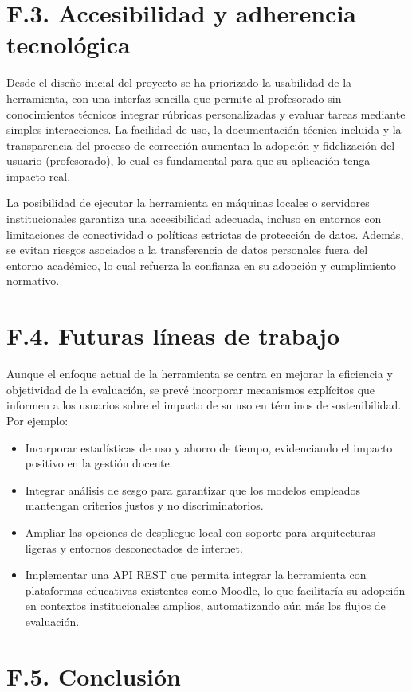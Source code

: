 \section*{F.3. Accesibilidad y adherencia tecnológica}
Desde el diseño inicial del proyecto se ha priorizado la usabilidad de la herramienta, con una interfaz sencilla que permite al profesorado sin conocimientos técnicos integrar rúbricas personalizadas y evaluar tareas mediante simples interacciones. La facilidad de uso, la documentación técnica incluida y la transparencia del proceso de corrección aumentan la adopción y fidelización del usuario (profesorado), lo cual es fundamental para que su aplicación tenga impacto real.

La posibilidad de ejecutar la herramienta en máquinas locales o servidores institucionales garantiza una accesibilidad adecuada, incluso en entornos con limitaciones de conectividad o políticas estrictas de protección de datos. Además, se evitan riesgos asociados a la transferencia de datos personales fuera del entorno académico, lo cual refuerza la confianza en su adopción y cumplimiento normativo.

\section*{F.4. Futuras líneas de trabajo}
Aunque el enfoque actual de la herramienta se centra en mejorar la eficiencia y objetividad de la evaluación, se prevé incorporar mecanismos explícitos que informen a los usuarios sobre el impacto de su uso en términos de sostenibilidad. Por ejemplo:

\begin{itemize}
  \item Incorporar estadísticas de uso y ahorro de tiempo, evidenciando el impacto positivo en la gestión docente.
  \item Integrar análisis de sesgo para garantizar que los modelos empleados mantengan criterios justos y no discriminatorios.
  \item Ampliar las opciones de despliegue local con soporte para arquitecturas ligeras y entornos desconectados de internet.
  \item Implementar una API REST que permita integrar la herramienta con plataformas educativas existentes como Moodle, lo que facilitaría su adopción en contextos institucionales amplios, automatizando aún más los flujos de evaluación.
\end{itemize}


\section*{F.5. Conclusión}

